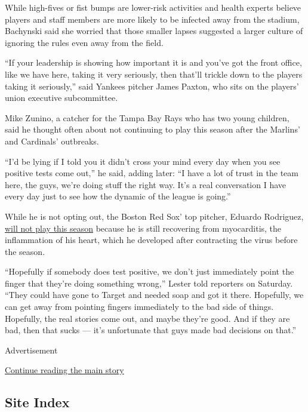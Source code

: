 While high-fives or fist bumps are lower-risk activities and health
experts believe players and staff members are more likely to be infected
away from the stadium, Bachynski said she worried that those smaller
lapses suggested a larger culture of ignoring the rules even away from
the field.

``If your leadership is showing how important it is and you've got the
front office, like we have here, taking it very seriously, then that'll
trickle down to the players taking it seriously,'' said Yankees pitcher
James Paxton, who sits on the players' union executive subcommittee.

Mike Zunino, a catcher for the Tampa Bay Rays who has two young
children, said he thought often about not continuing to play this season
after the Marlins' and Cardinals' outbreaks.

``I'd be lying if I told you it didn't cross your mind every day when
you see positive tests come out,'' he said, adding later: ``I have a lot
of trust in the team here, the guys, we're doing stuff the right way.
It's a real conversation I have every day just to see how the dynamic of
the league is going.''

While he is not opting out, the Boston Red Sox' top pitcher, Eduardo
Rodriguez,
\href{https://www.masslive.com/redsox/2020/08/eduardo-rodriguez-boston-red-sox-starter-out-for-season-with-heart-ailment.html}{will
not play this season} because he is still recovering from myocarditis,
the inflammation of his heart, which he developed after contracting the
virus before the season.

``Hopefully if somebody does test positive, we don't just immediately
point the finger that they're doing something wrong,'' Lester told
reporters on Saturday. ``They could have gone to Target and needed soap
and got it there. Hopefully, we can get away from pointing fingers
immediately to the bad side of things. Hopefully, the real stories come
out, and maybe they're good. And if they are bad, then that sucks ---
it's unfortunate that guys made bad decisions on that.''

Advertisement

\protect\hyperlink{after-bottom}{Continue reading the main story}

\hypertarget{site-index}{%
\subsection{Site Index}\label{site-index}}

